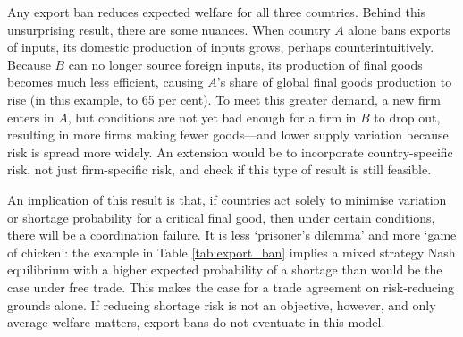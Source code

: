 \documentclass{article}
\begin{document}
Any export ban reduces expected welfare for all three countries. Behind this unsurprising result, there are some nuances. When country $A$ alone bans exports of inputs, its domestic production of inputs grows, perhaps counterintuitively. Because $B$ can no longer source foreign inputs, its production of final goods becomes much less efficient, causing $A$'s share of global final goods production to rise (in this example, to 65 per cent). To meet this greater demand, a new firm enters in $A$, but conditions are not yet bad enough for a firm in $B$ to drop out, resulting in more firms making fewer goods---and lower supply variation because risk is spread more widely. An extension would be to incorporate country-specific risk, not just firm-specific risk, and check if this type of result is still feasible.

An implication of this result is that, if countries act solely to minimise variation or shortage probability for a critical final good, then under certain conditions, there will be a coordination failure. It is less `prisoner's dilemma' and more `game of chicken': the example in Table \ref{tab:export_ban} implies a mixed strategy Nash equilibrium with a higher expected probability of a shortage than would be the case under free trade. This makes the case for a trade agreement on risk-reducing grounds alone. If reducing shortage risk is not an objective, however, and only average welfare matters, export bans do not eventuate in this model.
\end{document}
